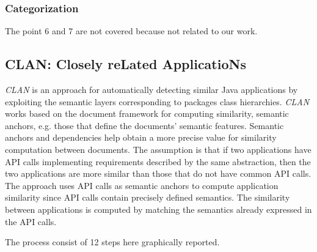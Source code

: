 \subsubsection{Categorization}
The point 6 and 7 are not covered because not related to our work.
\clearpage




\subsection{CLAN:  Closely reLated ApplicatioNs}\label{sec:clan}

\textit{CLAN} \cite{McMillan:2012:DSS:2337223.2337267} is an approach for automatically detecting similar Java applications by exploiting the semantic layers corresponding to packages class hierarchies. \textit{CLAN} works based on the document framework for computing similarity, semantic anchors, e.g. those that define the documents' semantic features. Semantic anchors and dependencies help obtain a more precise value for similarity computation between documents. The assumption is that if two applications have API calls implementing requirements described by the same abstraction, then the two applications are more similar than those that do not have common API calls. The approach uses API calls as semantic anchors to compute application similarity since API calls contain precisely defined semantics. The similarity between applications is computed by matching the semantics already expressed in the API calls.

The process consist of 12 steps here graphically reported.

